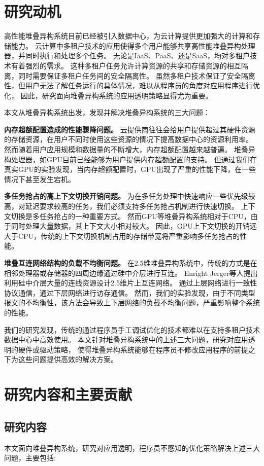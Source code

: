 \section{研究动机}
高性能堆叠异构系统目前已经被引入数据中心，为云计算提供更加强大的计算和存储能力。
云计算中多租户技术的应用使得多个用户能够共享高性能堆叠异构处理器，并同时执行和处理多个任务。
无论是IaaS、PaaS、还是SaaS，均对多租户技术有着强烈的需求。
这种多租户任务允许计算资源的共享和存储资源的相互隔离，同时需要保证多租户任务间的安全隔离性。
虽然多租户技术保证了安全隔离性，但用户无法了解任务运行的具体情况，难以从程序员的角度对应用程序进行优化，
因此，研究面向堆叠异构系统的应用透明策略显得尤为重要。

本文从堆叠异构系统出发，发现并解决堆叠异构系统的三大问题：

\textbf{内存超额配置造成的性能骤降问题。}
云提供商往往会给用户提供超过其硬件资源的存储资源，在用户不同时使用这些资源的情况下提高数据中心的资源利用率。
然而随着用户应用规模和数据量的不断增大，内存超额配置越来越普遍。
堆叠异构处理器，如GPU目前已经能够为用户提供内存超额配置的支持。
但通过我们在真实GPU的实验发现，当内存超额配置时，GPU出现了严重的性能下降，在一些情况下甚至发生宕机。

\textbf{多任务抢占的高上下文切换开销问题。}
为在多任务处理中快速响应一些优先级较高，对延迟要求较高的任务，我们必须支持多任务抢占机制进行快速切换。
上下文切换是多任务抢占的一种重要方式。
然而GPU等堆叠异构系统相对于CPU，由于同时处理大量数据，其上下文大小相对较大。
因此，GPU上下文切换的开销远大于CPU，传统的上下文切换机制占用的存储带宽将严重影响多任务抢占的性能。

\textbf{堆叠互连网络结构的负载不均衡问题。}
在2.5维堆叠异构系统中，传统的方式是在相邻处理器或存储器的四周边缘通过硅中介层进行互连。
Enright Jerger等人提出利用硅中介层大量的连线资源设计2.5维片上互连网络。
通过上层网络进行一致性协议通信，通过下层网络进行访存通信。
然而，我们的实验发现，由于不同类型报文的不均衡性，该方法会导致上下层网络的负载不均衡问题，严重影响整个系统的性能。

我们的研究发现，传统的通过程序员手工调试优化的技术都难以在支持多租户技术数据中心中高效使用。
本文针对堆叠异构系统中的上述三大问题，研究对应用透明的硬件或驱动策略，
使得堆叠异构系统能够在程序员不修改应用程序的前提之下为这些问题提供高效的解决方案。

\section{研究内容和主要贡献}

\subsection{研究内容}
本文面向堆叠异构系统，研究对应用透明，程序员不感知的优化策略解决上述三大问题，主要包括:


